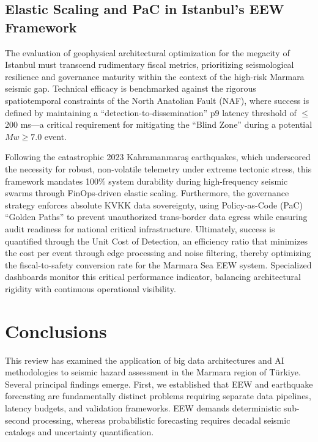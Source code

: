 \documentclass[data,article,accept,pdftex,moreauthors]{Definitions/mdpi}
\begin{document}
\subsection{Elastic Scaling and PaC in Istanbul's EEW Framework}
The evaluation of geophysical architectural optimization for the megacity of Istanbul must transcend rudimentary fiscal metrics, prioritizing seismological resilience and governance maturity within the context of the high-risk Marmara seismic gap. Technical efficacy is benchmarked against the rigorous spatiotemporal constraints of the North Anatolian Fault (NAF), where success is defined by maintaining a ``detection-to-dissemination'' p9 latency threshold of $\leq$200 ms---a critical requirement for mitigating the ``Blind Zone'' during a potential $Mw \geq 7.0$ event.

Following the catastrophic 2023 Kahramanmara\c{s} earthquakes, which underscored the necessity for robust, non-volatile telemetry under extreme tectonic stress, this framework mandates 100\% system durability during high-frequency seismic swarms through FinOps-driven elastic scaling. Furthermore, the governance strategy enforces absolute KVKK data sovereignty, using Policy-as-Code (PaC) ``Golden Paths'' to prevent unauthorized trans-border data egress while ensuring audit readiness for national critical infrastructure. Ultimately, success is quantified through the Unit Cost of Detection, an efficiency ratio that minimizes the cost per event through edge processing and noise filtering, thereby optimizing the fiscal-to-safety conversion rate for the Marmara Sea EEW system. Specialized dashboards monitor this critical performance indicator, balancing architectural rigidity with continuous operational visibility.

\section{Conclusions}

This review has examined the application of big data architectures and AI methodologies to seismic hazard assessment in the Marmara region of Türkiye. Several principal findings emerge. First, we established that EEW and earthquake forecasting are fundamentally distinct problems requiring separate data pipelines, latency budgets, and validation frameworks. EEW demands deterministic sub-second processing, whereas probabilistic forecasting requires decadal seismic catalogs and uncertainty quantification. 
\end{document}
